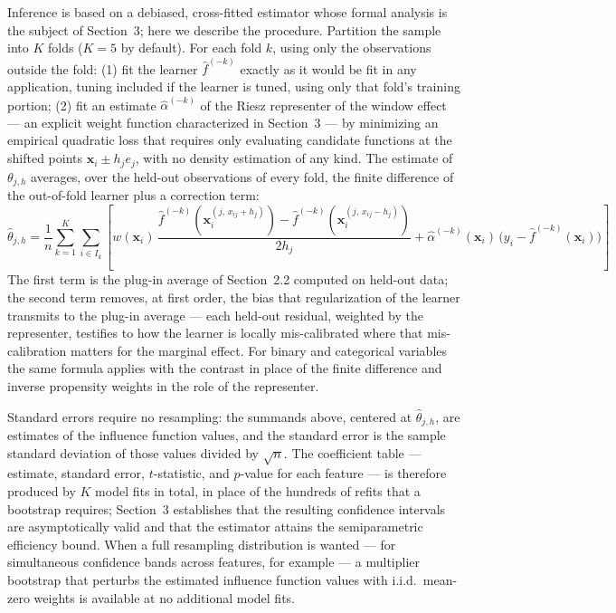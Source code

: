 \documentclass[12pt]{article}
\begin{document}
	Inference is based on a debiased, cross-fitted estimator whose formal analysis is
	the subject of Section~3; here we describe the procedure. Partition the sample
	into $K$ folds ($K = 5$ by default). For each fold $k$, using only the
	observations outside the fold: (1) fit the learner $\hat{f}^{(-k)}$ exactly as it would be fit in any application, tuning included if the learner is tuned, using only that fold's training portion; (2) fit an estimate $\hat{\alpha}^{(-k)}$ of the Riesz
	representer of the window effect --- an explicit weight function characterized in
	Section~3 --- by minimizing an empirical quadratic loss that requires only
	evaluating candidate functions at the shifted points $\mathbf{x}_i \pm h_j e_j$,
	with no density estimation of any kind. The estimate of $\theta_{j,h}$ averages,
	over the held-out observations of every fold, the finite difference of the
	out-of-fold learner plus a correction term:
	\begin{equation}
		\hat{\theta}_{j,h} = \frac{1}{n} \sum_{k=1}^{K} \sum_{i \in I_k} \left[
		w(\mathbf{x}_i)\,
		\frac{\hat{f}^{(-k)}\!\left(\mathbf{x}_i^{(j,\, x_{ij} + h_j)}\right)
		- \hat{f}^{(-k)}\!\left(\mathbf{x}_i^{(j,\, x_{ij} - h_j)}\right)}{2 h_j}
		+ \hat{\alpha}^{(-k)}(\mathbf{x}_i)\,
		\bigl(y_i - \hat{f}^{(-k)}(\mathbf{x}_i)\bigr)
		\right]
	\end{equation}
	The first term is the plug-in average of Section~2.2 computed on held-out data;
	the second term removes, at first order, the bias that regularization of the
	learner transmits to the plug-in average --- each held-out residual, weighted by
	the representer, testifies to how the learner is locally mis-calibrated where
	that mis-calibration matters for the marginal effect. For binary and categorical
	variables the same formula applies with the contrast in place of the finite
	difference and inverse propensity weights in the role of the representer.
	
	Standard errors require no resampling: the summands above, centered at
	$\hat{\theta}_{j,h}$, are estimates of the influence function values, and the
	standard error is the sample standard deviation of those values divided by
	$\sqrt{n}$. The coefficient table --- estimate, standard error, $t$-statistic,
	and $p$-value for each feature --- is therefore produced by $K$ model fits in
	total, in place of the hundreds of refits that a bootstrap requires; Section~3
	establishes that the resulting confidence intervals are asymptotically valid and
	that the estimator attains the semiparametric efficiency bound. When a full
	resampling distribution is wanted --- for simultaneous confidence bands across
	features, for example --- a multiplier bootstrap that perturbs the estimated
	influence function values with i.i.d.\ mean-zero weights is available at no
	additional model fits.
	
\end{document}
